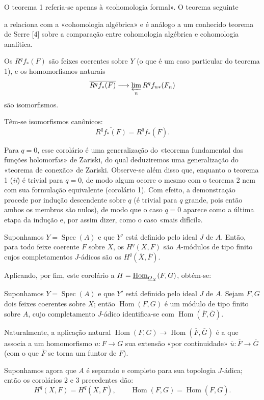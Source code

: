 O teorema 1 referia-se apenas à «cohomologia formal». O teorema seguinte

a relaciona com a «cohomologia algébrica» e é análogo a um conhecido teorema
de Serre [4] sobre a comparação entre cohomologia algébrica e cohomologia
analítica.

 Os
$R^{q}f_{*}(F)$ são feixes coerentes sobre $Y$ (o que é um caso particular
do teorema 1), e os homomorfismos naturais
\[
  \overline{R^{q}f_{*}(F)}
  \longrightarrow \varprojlim_n R^{q}f_{n*}(F_n)
\]
são isomorfismos.

 Têm-se isomorfismos canônicos:
\[
  \overline{R^{q}f_{*}(F)}=R^{q}\overline f_{*}(\overline F).
\]

Para $q=0$, esse corolário é uma generalização do «teorema fundamental das
funções holomorfas» de Zariski, do qual deduziremos uma generalização do
«teorema de conexão» de Zariski. Observe-se além disso que, enquanto o teorema 1
(\textit{ii}) é trivial para $q=0$, de modo algum ocorre o mesmo com o
teorema 2 nem com sua formulação equivalente (corolário 1). Com efeito, a
demonstração procede por indução descendente sobre $q$ (é trivial para $q$
grande, pois então ambos os membros são nulos), de modo que o caso $q=0$
aparece como a última etapa da indução e, por assim dizer, como o caso «mais
difícil».

 Suponhamos $Y=\operatorname{Spec}(A)$ e que $Y'$ está
definido pelo ideal $J$ de $A$. Então, para todo feixe coerente $F$ sobre
$X$, os $H^{q}(X,F)$ são $A$-módulos de tipo finito cujos completamentos
$J$-ádicos são os $H^{q}(\overline X,\overline F)$.

Aplicando, por fim, este corolário a
$H=\underline{\operatorname{Hom}}_{\underline{O}_X}(F,G)$, obtém-se:

 Suponhamos $Y=\operatorname{Spec}(A)$ e que $Y'$ está
definido pelo ideal $J$ de $A$. Sejam $F,G$ dois feixes coerentes sobre $X$;
então $\operatorname{Hom}(F,G)$ é um módulo de tipo finito sobre $A$, cujo
completamento $J$-ádico identifica-se com
$\operatorname{Hom}(\overline F,\overline G)$.

Naturalmente, a aplicação natural
$\operatorname{Hom}(F,G)\longrightarrow
\operatorname{Hom}(\overline F,\overline G)$ é a que associa a um
homomorfismo $u:F\longrightarrow G$ sua extensão «por continuidade»
$\overline u:\overline F\longrightarrow\overline G$ (com o que
$\overline F$ se torna um funtor de $F$).

Suponhamos agora que $A$ é separado e completo para sua topologia $J$-ádica;
então os corolários 2 e 3 precedentes dão:
\[
  H^{q}(X,F)=H^{q}(\overline X,\overline F),
  \qquad
  \operatorname{Hom}(F,G)
  =\operatorname{Hom}(\overline F,\overline G).
\]

